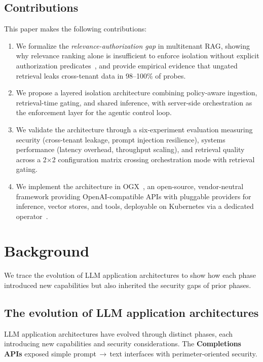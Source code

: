 \documentclass[sigconf]{acmart}
\begin{document}
\subsection{Contributions}
This paper makes the following contributions:
\begin{enumerate}
  \item We formalize the \emph{relevance-authorization gap} in multitenant RAG, showing why relevance ranking alone is insufficient to enforce isolation without explicit authorization predicates~\cite{karpukhin2020dpr,johnson2017faiss}, and provide empirical evidence that ungated retrieval leaks cross-tenant data in 98--100\% of probes.

  \item We propose a layered isolation architecture combining policy-aware ingestion, retrieval-time gating, and shared inference, with server-side orchestration as the enforcement layer for the agentic control loop.

  \item We validate the architecture through a six-experiment evaluation measuring security (cross-tenant leakage, prompt injection resilience), systems performance (latency overhead, throughput scaling), and retrieval quality across a 2$\times$2 configuration matrix crossing orchestration mode with retrieval gating.

  \item We implement the architecture in OGX~\cite{ogx}, an open-source, vendor-neutral framework providing OpenAI-compatible APIs with pluggable providers for inference, vector stores, and tools, deployable on Kubernetes via a dedicated operator~\cite{ogxk8soperator}.
\end{enumerate}

\section{Background}

We trace the evolution of LLM application architectures to show how each phase introduced new capabilities but also inherited the security gaps of prior phases.

\subsection{The evolution of LLM application architectures}
LLM application architectures have evolved through distinct phases, each introducing new capabilities and security considerations.
The \textbf{Completions APIs} exposed simple prompt\,$\rightarrow$\,text interfaces with perimeter-oriented security.
\end{document}
